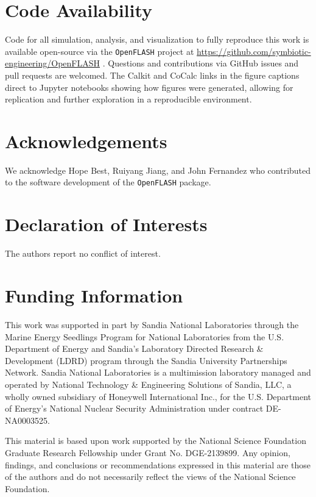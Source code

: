 \documentclass[lineno]{JFM-FLM_Au}
\begin{document}
\ifdefined\DISSERTATION
    \section*{Code Availability}
    Code for all simulation, analysis, and visualization to fully reproduce this work is available open-source via the \texttt{OpenFLASH} project at
    \url{https://github.com/symbiotic-engineering/OpenFLASH} \citep{best_openflash_2026,best_openflash-code_2026}.
    Questions and contributions via GitHub issues and pull requests are welcomed.
    The Calkit and CoCalc links in the figure captions direct to Jupyter notebooks showing how figures were generated, allowing for replication and further exploration in a reproducible environment.

    \section*{Acknowledgements}
    We acknowledge Hope Best, Ruiyang Jiang, and John Fernandez who contributed to the software development of the \texttt{OpenFLASH} package.

    \section*{Declaration of Interests}
    The authors report no conflict of interest.

    \section*{Funding Information}
    This work was supported in part by Sandia National Laboratories through the Marine Energy Seedlings Program for National Laboratories from the U.S. Department of Energy and Sandia's Laboratory Directed Research \& Development (LDRD) program through the Sandia University Partnerships Network. 
    Sandia National Laboratories is a multimission laboratory managed and operated by National Technology \& Engineering Solutions of Sandia, LLC, a wholly owned subsidiary of Honeywell International Inc., for the U.S. Department of Energy's National Nuclear Security Administration under contract DE-NA0003525.

    This material is based upon work supported by the National Science Foundation Graduate Research Fellowship under Grant No. DGE-2139899.
Any opinion, findings, and conclusions or recommendations expressed in this material are those of the authors and do not necessarily reflect the views of the National Science Foundation.
\end{document}
